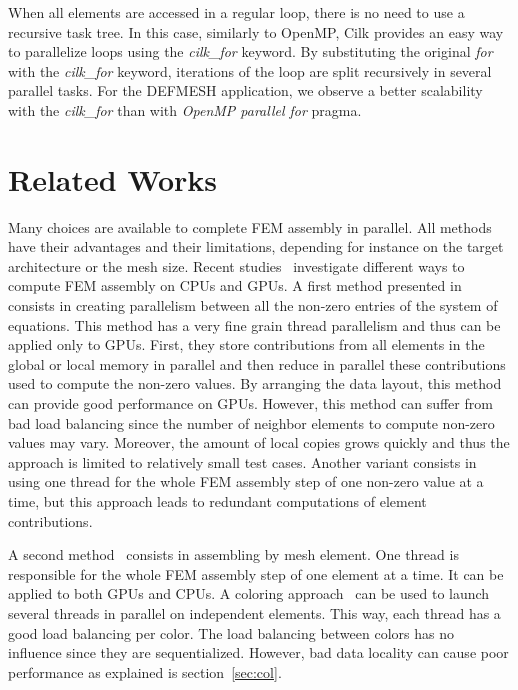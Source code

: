 \documentclass{IOS-Book-Article}
\begin{document}
When all elements are accessed in a regular loop, there is no need to use a recursive task tree.
In this case, similarly to OpenMP, Cilk provides an easy way to parallelize loops using the \emph{cilk\_for} keyword.
By substituting the original \emph{for} with the \emph{cilk\_for} keyword, iterations of the loop are split recursively in several parallel tasks.
For the DEFMESH application, we observe a better scalability with the \emph{cilk\_for} than with \emph{OpenMP parallel for} pragma.


\section{Related Works}
Many choices are available to complete FEM assembly in parallel.
All methods have their advantages and their limitations, depending for instance on the target architecture or the mesh size.
Recent studies~\cite{cecka2011assembly,CPUGPUasm} investigate different ways to compute FEM assembly on CPUs and GPUs.
A first method presented in~\cite{cecka2011assembly} consists in creating parallelism between all the non-zero entries of the system of equations.
This method has a very fine grain thread parallelism and thus can be applied only to GPUs.
First, they store contributions from all elements in the global or local memory in parallel and then reduce in parallel these contributions used to compute the non-zero values.
By arranging the data layout, this method can provide good performance on GPUs.
However, this method can suffer from bad load balancing since the number of neighbor elements to compute non-zero values may vary.
Moreover, the amount of local copies grows quickly and thus the approach is limited to relatively small test cases.
Another variant consists in using one thread for the whole FEM assembly step of one non-zero value at a time, but this approach leads to redundant computations of element contributions.

A second method~\cite{cecka2011assembly} consists in assembling by mesh element. One thread is responsible for the whole FEM assembly step of one element at a time.
It can be applied to both GPUs and CPUs.
A coloring approach~\cite{CUDAfe,CPUfe} can be used to launch several threads in parallel on independent elements.
This way, each thread has a good load balancing per color. The load balancing between colors has no influence since they are sequentialized.
However, bad data locality can cause poor performance as explained is section~\ref{sec:col}.
\end{document}
